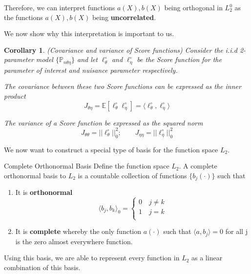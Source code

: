 \documentclass[twoside]{article}
\newtheorem{corollary}[theorem]{Corollary}
\newcommand{\prob}{\mathbb{P}}
\begin{document}
Therefore, we can interpret functions $a(X), b(X)$ being orthogonal in $L_{2}^{0}$ as the functions $a(X), b(X)$ being \textbf{uncorrelated}.

We now show why this interpretation is important to us.
\begin{corollary}(Covariance and variance of Score functions) Consider the i.i.d 2-parameter model $\{\prob_{n \theta \eta}\}$ and let $\ell_{\theta}^{\circ}$ and $\ell_{\eta}^{\circ}$ be the Score function for the parameter of interest and nuisance parameter respectively. 

The covariance between these two Score functions can be expressed as the inner product 
\begin{equation}
  J_{\theta \eta} = \mathbb{E}[\ell_{\theta}^{\circ}\ell_{\eta}^{\circ}] = \langle \ell_{\theta}^{\circ}, \ell_{\eta}^{\circ}\rangle
\end{equation}

The variance of a Score function be expressed as the squared norm 
\begin{equation}
  J_{\theta \theta} = ||\ell_{\theta}^{\circ}||_{0}^{2}; \quad \quad J_{\eta \eta} = ||\ell_{\eta}^{\circ}||_{0}^{2}
\end{equation}

\end{corollary}

We now want to construct a special type of basis for the function space $L_2.$

\begin{definition_exam}{Complete Orthonormal Basis}{} Define the function space $L_2.$ A complete orthonormal basis to $L_2$ is a countable collection of functions $\{b_j(\cdot)\}$ such that 
\begin{enumerate}
  \item It is \textbf{orthonormal}
  $$
\langle b_j, b_k \rangle_0 = 
\begin{cases}
0 \quad j \neq k\\
1 \quad j = k\\
\end{cases}
  $$
  \item It is \textbf{complete} whereby the only function $a(\cdot)$ such that $\langle a, b_j \rangle = 0$ for all j is the zero almost everywhere function.
\end{enumerate}
\end{definition_exam}

Using this basis, we are able to represent every function in $L_2$ as a linear combination of this basis.
\end{document}
